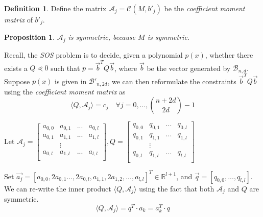 \documentclass[12pt]{amsart}
\numberwithin{equation}{section}
\newtheorem{prop}[thm]{Proposition}
\theoremstyle{definition}
\newtheorem{definition}[thm]{Definition}
\numberwithin{thm}{section}
\begin{document}
\begin{definition}
Define the matrix $\mathcal{A}_j = \mathcal{C}(M, b'_j)$ be the \emph{coefficient moment matrix} of $b'_j$.
\end{definition}

\begin{prop}
     $\mathcal{A}_j$ is symmetric, because $M$ is symmetric.
\end{prop}

\smallskip
Recall, the \emph{SOS} problem is to decide, given a polynomial $p(x)$, 
whether there exists a $Q \curlyeqprec 0$ such that $p = \vec{b}^TQ \vec{b}$, where $\vec{b}$ be the vector generated by $\mathcal{B}_{n, d}$.
Suppose $p(x)$ is given in $\mathcal{B'}_{n, 2d}$, we can then reformulate the constraints $\vec{b}^TQ \vec{b}$ using the \emph{coefficient moment matrix} as
\begin{equation}
     \langle Q, \mathcal{A}_j \rangle = c_j \quad \forall j = 0,...,{n + 2d \choose 2d} - 1
\end{equation} 

\smallskip
Let $\mathcal{A}_j = \begin{bmatrix}
               a_{0, 0} & a_{0, 1} & ... &a_{0, l}\\
               a_{0, 1} & a_{1, 1} & ... &a_{1, l} \\
               & \vdots \\
               a_{0, l} & a_{1, l} &... &a_{l, l}\\
     \end{bmatrix}, 
          Q = \begin{bmatrix}
               q_{0, 0} & q_{0, 1} & ... &q_{0, l}\\
               q_{0, 1} & q_{1, 1} & ... &q_{1, l} \\
               & \vdots \\
               q_{0, l} & q_{1, l} &... &q_{l, l}\\
          \end{bmatrix} $

Set $\vec{a_j} = [a_{0, 0}, 2a_{0, 1}..., 2a_{0, l}, a_{1, 1}, 2a_{1, 2}, ..., a_{l, l}]^T \in \mathbb{R}^{l + 1}$, and
$\vec{q} = [q_{0, 0}, ..., q_{l, l}]$.
We can re-write the inner product $\langle Q, \mathcal{A}_j \rangle$ using the fact that both $\mathcal{A}_j$ and $Q$ are symmetric. \begin{equation}
     \langle Q, \mathcal{A}_j \rangle = q^T \cdot a_k = a_k^T \cdot q
\end{equation}
\end{document}
